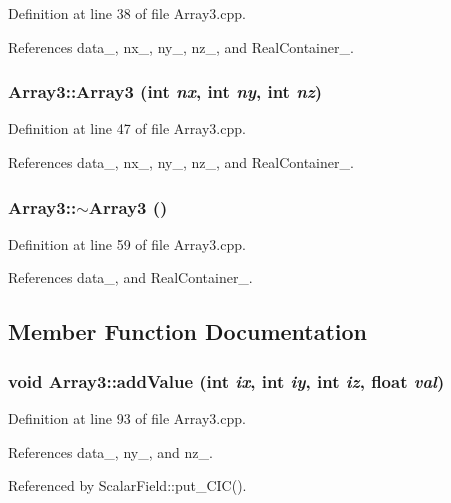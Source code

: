 Definition at line 38 of file Array3.cpp.



References data\_\-, nx\_\-, ny\_\-, nz\_\-, and RealContainer\_\-.

\subsubsection[{Array3}]{\setlength{\rightskip}{0pt plus 5cm}Array3::Array3 (int {\em nx}, \/  int {\em ny}, \/  int {\em nz})}\label{classArray3_a5eaf94a79b17fa9d4254267edf6bed63}


Definition at line 47 of file Array3.cpp.



References data\_\-, nx\_\-, ny\_\-, nz\_\-, and RealContainer\_\-.

\subsubsection[{$\sim$Array3}]{\setlength{\rightskip}{0pt plus 5cm}Array3::$\sim$Array3 ()}\label{classArray3_a2efbbb3070df605bb7a71c65771b0d46}


Definition at line 59 of file Array3.cpp.



References data\_\-, and RealContainer\_\-.



\subsection{Member Function Documentation}
\subsubsection[{addValue}]{\setlength{\rightskip}{0pt plus 5cm}void Array3::addValue (int {\em ix}, \/  int {\em iy}, \/  int {\em iz}, \/  float {\em val})}\label{classArray3_a3693476b41ac4fccd86c2acfa7960053}


Definition at line 93 of file Array3.cpp.



References data\_\-, ny\_\-, and nz\_\-.



Referenced by ScalarField::put\_\-CIC().

